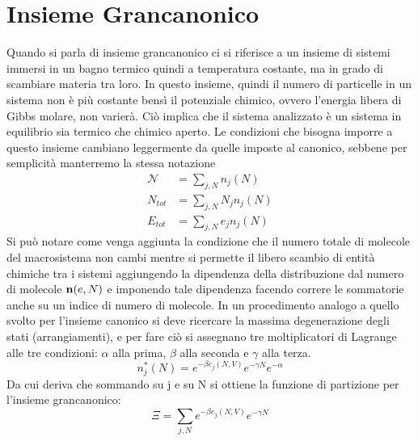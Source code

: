 \documentclass[oneside]{amsbook}
\numberwithin{section}{chapter}
\numberwithin{equation}{section}
\numberwithin{figure}{section}
\begin{document}
\section{Insieme Grancanonico}
Quando si parla di insieme grancanonico ci si riferisce a un insieme di sistemi immersi in un bagno termico quindi a temperatura costante, ma in grado di scambiare materia tra loro. In questo insieme, quindi il numero di particelle in un sistema non è più costante bensì il potenziale chimico, ovvero l'energia libera di Gibbs molare, non varierà. Ciò implica che il sistema analizzato è un sistema in equilibrio sia termico che chimico aperto.
Le condizioni che bisogna imporre a questo insieme cambiano leggermente da quelle imposte al canonico, sebbene per semplicità manterremo la stessa notazione
\begin{equation}
\begin{aligned}
\mathcal{N}&=\sum_{j,N} n_j(N)\\
N_{tot} &= \sum_{j,N} N_jn_j(N)\\
E_{tot}&= \sum_{j,N} e_jn_j(N)
\end{aligned}
\end{equation}
Si può notare come venga aggiunta la condizione che il numero totale di molecole del macrosistema non cambi mentre si permette il libero scambio di entità chimiche tra i sistemi aggiungendo la dipendenza della distribuzione dal numero di molecole $\bold{n}(e,N)$ e imponendo tale dipendenza facendo correre le sommatorie anche su un indice di numero di molecole.
In un procedimento analogo a quello svolto per l'insieme canonico si deve ricercare la massima degenerazione degli stati (arrangiamenti), e per fare ciò si assegnano tre moltiplicatori di Lagrange alle tre condizioni: $\alpha$ alla prima, $\beta$ alla seconda e $\gamma$ alla terza.
\begin{equation}
n^*_j(N) = e^{-\beta e_j(N,V)}e^{-\gamma N}e^{-\alpha}
\end{equation}
Da cui deriva che sommando su j e su N si ottiene la funzione di partizione per l'insieme grancanonico:
\begin{equation}
\Xi =\sum_{j,N}e^{-\beta e_j(N,V)}e^{-\gamma N}
\end{equation}
\end{document}
